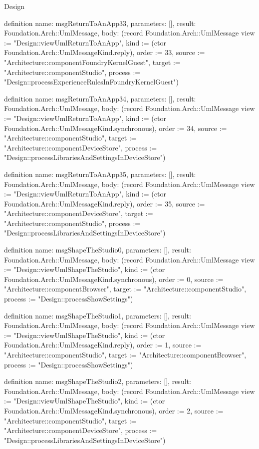 \begin{lexlean}{Design}
\begin{semanticmodule}
definition{
  name: msgReturnToAnApp33,
  parameters: [],
  result: Foundation.Arch::UmlMessage,
  body: (record Foundation.Arch::UmlMessage {view := "Design::viewUmlReturnToAnApp", kind := (ctor Foundation.Arch::UmlMessageKind.reply), order := 33, source := "Architecture::componentFoundryKernelGuest", target := "Architecture::componentStudio", process := "Design::processExperienceRulesInFoundryKernelGuest"})
}

definition{
  name: msgReturnToAnApp34,
  parameters: [],
  result: Foundation.Arch::UmlMessage,
  body: (record Foundation.Arch::UmlMessage {view := "Design::viewUmlReturnToAnApp", kind := (ctor Foundation.Arch::UmlMessageKind.synchronous), order := 34, source := "Architecture::componentStudio", target := "Architecture::componentDeviceStore", process := "Design::processLibrariesAndSettingsInDeviceStore"})
}

definition{
  name: msgReturnToAnApp35,
  parameters: [],
  result: Foundation.Arch::UmlMessage,
  body: (record Foundation.Arch::UmlMessage {view := "Design::viewUmlReturnToAnApp", kind := (ctor Foundation.Arch::UmlMessageKind.reply), order := 35, source := "Architecture::componentDeviceStore", target := "Architecture::componentStudio", process := "Design::processLibrariesAndSettingsInDeviceStore"})
}

definition{
  name: msgShapeTheStudio0,
  parameters: [],
  result: Foundation.Arch::UmlMessage,
  body: (record Foundation.Arch::UmlMessage {view := "Design::viewUmlShapeTheStudio", kind := (ctor Foundation.Arch::UmlMessageKind.synchronous), order := 0, source := "Architecture::componentBrowser", target := "Architecture::componentStudio", process := "Design::processShowSettings"})
}

definition{
  name: msgShapeTheStudio1,
  parameters: [],
  result: Foundation.Arch::UmlMessage,
  body: (record Foundation.Arch::UmlMessage {view := "Design::viewUmlShapeTheStudio", kind := (ctor Foundation.Arch::UmlMessageKind.reply), order := 1, source := "Architecture::componentStudio", target := "Architecture::componentBrowser", process := "Design::processShowSettings"})
}

definition{
  name: msgShapeTheStudio2,
  parameters: [],
  result: Foundation.Arch::UmlMessage,
  body: (record Foundation.Arch::UmlMessage {view := "Design::viewUmlShapeTheStudio", kind := (ctor Foundation.Arch::UmlMessageKind.synchronous), order := 2, source := "Architecture::componentStudio", target := "Architecture::componentDeviceStore", process := "Design::processLibrariesAndSettingsInDeviceStore"})
}


\end{semanticmodule}
\end{lexlean}
